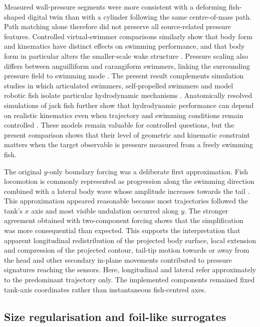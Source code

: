 \documentclass[openacc]{rsproca_new}
\begin{document}
Measured wall-pressure segments were more consistent with a deforming fish-shaped digital twin than with a cylinder following the same centre-of-mass path. Path matching alone therefore did not preserve all source-related pressure features. Controlled virtual-swimmer comparisons similarly show that body form and kinematics have distinct effects on swimming performance, and that body form in particular alters the smaller-scale wake structure \cite{borazjani2010}. Pressure scaling also differs between anguilliform and carangiform swimmers, linking the surrounding pressure field to swimming mode \cite{daghooghi2025}. The present result complements simulation studies in which articulated swimmers, self-propelled swimmers and model robotic fish isolate particular hydrodynamic mechanisms \cite{jiao2021,verma2018,feng2024,cui2024}. Anatomically resolved simulations of jack fish further show that hydrodynamic performance can depend on realistic kinematics even when trajectory and swimming conditions remain controlled \cite{khalid2021}. These models remain valuable for controlled questions, but the present comparison shows that their level of geometric and kinematic constraint matters when the target observable is pressure measured from a freely swimming fish.

The original $y$-only boundary forcing was a deliberate first approximation. Fish locomotion is commonly represented as progression along the swimming direction combined with a lateral body wave whose amplitude increases towards the tail \cite{sfakiotakis1999}. This approximation appeared reasonable because most trajectories followed the tank's $x$ axis and most visible undulation occurred along $y$. The stronger agreement obtained with two-component forcing shows that the simplification was more consequential than expected. This supports the interpretation that apparent longitudinal redistribution of the projected body surface, local extension and compression of the projected contour, tail-tip motion towards or away from the head and other secondary in-plane movements contributed to pressure signatures reaching the sensors. Here, longitudinal and lateral refer approximately to the predominant trajectory only. The implemented components remained fixed tank-axis coordinates rather than instantaneous fish-centred axes.

\subsection{Size regularisation and foil-like surrogates}
\end{document}
